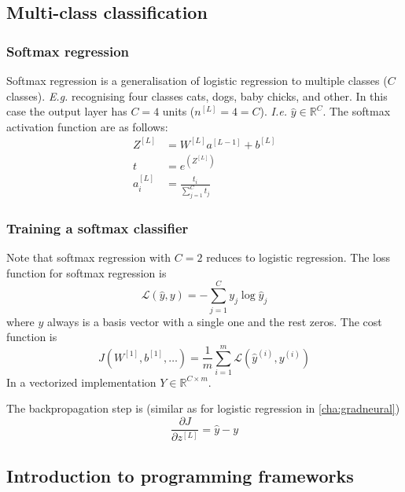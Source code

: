 \documentclass{article}
\begin{document}
\subsection{Multi-class classification}
\subsubsection{Softmax regression}
Softmax regression is a generalisation of logistic regression to multiple classes ($C$ classes).
\emph{E.g.} recognising four classes cats, dogs, baby chicks, and other.
In this case the output layer has $C=4$ units ($n^{[L]}=4=C$).
\emph{I.e.} $\hat{y}\in\mathbb{R}^C$.
The softmax activation function are as follows:
\begin{equation}
  \begin{split}
    Z^{[L]}&=W^{[L]}a^{[L-1]}+b^{[L]}\\
    t&=e^{(Z^{[L]})}\\
    a_i^{[L]}&=\frac{t_i}{\sum_{j=1}^C t_j}
  \end{split}
\end{equation}

\subsubsection{Training a softmax classifier}
Note that softmax regression with $C=2$ reduces to logistic regression.
The loss function for softmax regression is
\begin{equation}
  \mathcal{L}(\hat{y},y)=-\sum_{j=1}^C y_j\log\hat{y}_j
\end{equation}
where $y$ always is a basis vector with a single one and the rest zeros.
The cost function is
\begin{equation}
  J(W^{[1]},b^{[1]},\ldots)=\frac{1}{m}\sum_{i=1}^m\mathcal{L}(\hat{y}^{(i)},y^{(i)})
\end{equation}
In a vectorized implementation $Y\in\mathbb{R}^{C\times m}$.

The backpropagation step is (similar as for logistic regression in \cref{cha:gradneural})
\begin{equation}
  \frac{\partial J}{\partial z^{[L]}}=\hat{y}-y
\end{equation}

\subsection{Introduction to programming frameworks}
\end{document}
